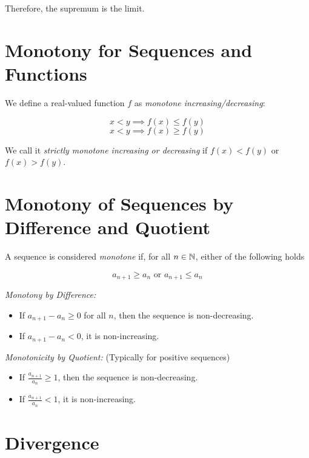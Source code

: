 Therefore, the supremum is the limit.

\QED

\section{Monotony for Sequences and Functions}

We define a real-valued function \(f\) as \emph{monotone increasing/decreasing}:

\[
	x < y \implies f(x) \le f(y)
\]
\[
	x < y \implies f(x) \ge f(y)
\]

We call it \emph{strictly monotone increasing or decreasing} if \(f(x) < f(y)\) or \(f(x) > f(y)\).


\section{Monotony of Sequences by Difference and Quotient}

A sequence is considered \emph{monotone} if, for all \(n \in \mathbb{N}\), either of the following holds

\[
	a_{n + 1} \ge a_{n} \text{ or } a_{n + 1} \le a_n
\]

\emph{Monotony by Difference:}

\begin{itemize}

	\item If \(a_{n+1} - a_n \ge 0\) for all \(n\), then the sequence is non-decreasing.

	\item If \(a_{n+1} - a_n < 0\), it is non-increasing.

\end{itemize}

\emph{Monotonicity by Quotient:} (Typically for positive sequences)

\begin{itemize}

	\item If \(\frac{a_{n+1}}{a_n} \ge 1\), then the sequence is non-decreasing.

	\item If \(\frac{a_{n+1}}{a_n} < 1\), it is non-increasing.

\end{itemize}

\section{Divergence}

